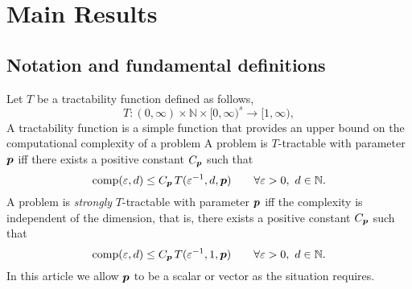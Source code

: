 \documentclass[11pt,a4paper]{article}
\begin{document}
\section{Main Results}

\subsection{Notation and fundamental definitions}
Let $T$ be a tractability function defined as follows,
\[
T :(0,\infty) \times \mathbb{N} \times [0,\infty)^s \rightarrow [1,\infty),
\]
A tractability function is a simple function that provides an upper bound on the computational complexity of a problem
A problem is $T$-tractable with parameter $\boldsymbol{p}$ iff there exists a positive constant $C_{\boldsymbol{p}}$ such that
\begin{equation} \label{eq:tract_def}
	\operatorname{comp}(\varepsilon,d) \le C_{\boldsymbol{p}}\, T(\varepsilon^{-1},d,\boldsymbol{p}) \qquad \forall \varepsilon >0, \ d \in \mathbb{N}.
\end{equation}
A problem is \emph{strongly}
$T$-tractable with parameter $\boldsymbol{p}$ iff the complexity is independent of the dimension, that is, there exists a positive constant $C_{\boldsymbol{p}}$ such that
\begin{equation} \label{eq:strong_tract_def}
	\operatorname{comp}(\varepsilon,d) \le C_{\boldsymbol{p}}\, T(\varepsilon^{-1},1,\boldsymbol{p}) \qquad \forall \varepsilon >0 , \ d \in \mathbb{N}.
\end{equation}
In this article we allow $\boldsymbol{p}$ to be a scalar or vector as the situation requires.
\end{document}
